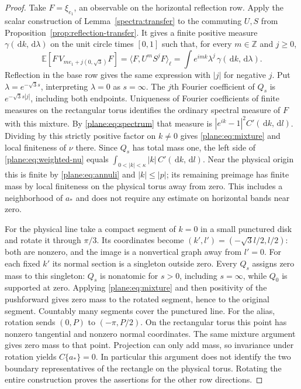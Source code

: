 \documentclass[11pt]{article}
\newcommand{\Z}{\mathbb Z}
\newcommand{\E}{\mathbb E}
\newcommand{\dd}{\,\mathrm d}
\theoremstyle{definition}
\theoremstyle{remark}
\numberwithin{equation}{section}
\begin{document}
\begin{proof}
Take $F=\xi_{e_1}$, an observable on the horizontal reflection row.
Apply the scalar construction of Lemma~\ref{spectra:transfer} to the
commuting $U,S$ from Proposition~\ref{prop:reflection-transfer}.
It gives a finite positive measure $\gamma(\dd k,\dd\lambda)$ on the
unit circle times $[0,1]$ such that, for every $m\in\Z$ and $j\ge0$,
\[
 \E[F\,V_{me_1+j(0,\sqrt3)}F]
   =\langle F,U^mS^jF\rangle_\ell
   =\int e^{imk}\lambda^j\,\gamma(\dd k,\dd\lambda).
\]
Reflection in the base row gives the same expression with $|j|$ for
negative $j$.  Put $\lambda=e^{-\sqrt3s}$, interpreting $\lambda=0$ as
$s=\infty$.  The $j$th Fourier coefficient of $Q_s$ is
$e^{-\sqrt3s|j|}$, including both endpoints.  Uniqueness of Fourier
coefficients of finite measures on the rectangular torus identifies
the ordinary spectral measure of $F$ with this mixture.
By \eqref{plane:eq:spectrum} that measure is
$|e^{ik}-1|^2 C'(\dd k,\dd l)$.  Dividing by this strictly positive
factor on $k\ne0$ gives \eqref{plane:eq:mixture} and local finiteness
of $\nu$ there.
Since $Q_s$ has total mass one, the left side of
\eqref{plane:eq:weighted-nu} equals
$\int_{0<|k|<\kappa}|k|\,C'(\dd k,\dd l)$.
Near the physical origin this is finite by \eqref{plane:eq:annuli} and
$|k|\le|p|$; its remaining preimage has finite mass by local finiteness
on the physical torus away from zero.  This includes a neighborhood of
$a_*$ and does not require any estimate on horizontal bands near zero.

For the physical line take a compact segment of $k=0$ in a small
punctured disk and rotate it through $\pi/3$.  Its coordinates become
$(k',l')=(-\sqrt3l/2,l/2)$: both are nonzero, and the image is a
nonvertical graph away from $l'=0$.  For each fixed $k'$ its normal
section is a singleton outside zero.  Every $Q_s$ assigns zero mass
to this singleton: $Q_s$ is nonatomic for $s>0$, including $s=\infty$,
while $Q_0$ is supported at zero.  Applying \eqref{plane:eq:mixture}
and then positivity of the pushforward gives zero mass to the rotated
segment, hence to the original segment.  Countably many segments cover
the punctured line.
For the alias, rotation sends $(0,P)$ to $(-\pi,P/2)$.
On the rectangular torus this point has nonzero tangential and nonzero
normal coordinates.  The same mixture argument gives zero mass to that
point.  Projection can only add mass, so invariance under rotation yields
$C\{a_*\}=0$.  In particular this argument does not identify the two
boundary representatives of the rectangle on the physical torus.
Rotating the entire construction proves the assertions for the other
row directions.
\end{proof}
\end{document}
